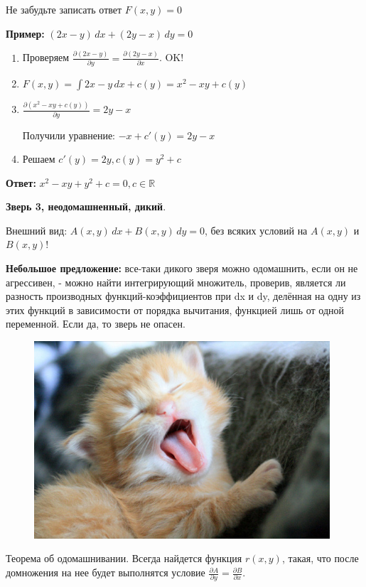 \documentclass[10pt,a4paper]{article}
\begin{document}
\par Не забудьте записать ответ $F(x,y) = 0$
\par \textbf{Пример:} $(2x - y) \, dx + (2y - x) \, dy = 0$
\begin{enumerate}
\item Проверяем $\frac{\partial{(2x-y)}}{\partial{y}} = \frac{\partial{(2y-x)}}{\partial{x}}$. OK!
\item $F(x,y) = \int 2x - y \, dx + c(y) = x^2 - xy + c(y)$
\item $\frac{\partial{(x^2 - xy + c(y))}}{\partial{y}} = 2y - x$
\par Получили уравнение: $ -x + c'(y) = 2y - x$
\item Решаем $c'(y) = 2y, c(y) = y^2 + c$
\end{enumerate}
\par \textbf{Ответ:} $x^2 - xy + y^2 + c = 0, c \in \mathbb{R}$ \\
\par \textbf{Зверь 3, неодомашненный, дикий}.
\par Внешний вид: $A(x, y) \, dx + B(x,y) \, dy = 0$, без всяких условий на $A(x,y)$ и $B(x,y)$!
\par \textbf{Небольшое предложение:} все-таки дикого зверя можно одомашнить, если
он не агрессивен, - можно найти интегрирующий множитель, проверив,
является ли разность производных функций-коэффициентов при dx и dy,
делённая на одну из этих функций в зависимости от порядка вычитания,
функцией лишь от одной переменной. Если да, то зверь не опасен.
\newpage
\pagecolor{magenta}
\begin{figure}[h]
\centering
\includegraphics[width=11cm]{pussy.jpg}
\end{figure}
\par Теорема об одомашнивании. Всегда найдется функция $r(x,y)$, такая, что после домножения на нее будет выполнятся условие $\frac{\partial{A}}{\partial{y}} = \frac{\partial{B}}{\partial{x}}$.
\end{document}
